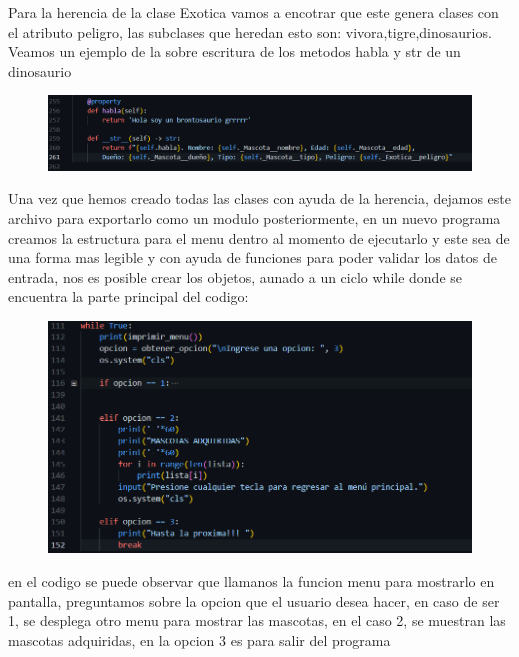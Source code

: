 \documentclass[12pt]{article}
\begin{document}
Para la herencia de la clase Exotica vamos a encotrar que este genera clases con el atributo peligro, las subclases que heredan esto son: vivora,tigre,dinosaurios. Veamos un ejemplo de la sobre escritura de los metodos habla y str de un dinosaurio
\begin{figure}[H]
		\begin{center}
 			\includegraphics[width = .9\textwidth]{13.png}
 			
 			 	
		\end{center} 
\end{figure}
Una vez que hemos creado todas las clases con ayuda de la herencia, dejamos este archivo para exportarlo como un modulo posteriormente, en un nuevo programa creamos la estructura para el menu dentro al momento de ejecutarlo y este sea de una forma mas legible y con ayuda de funciones para poder validar los datos de entrada, nos es posible crear los objetos, aunado a un ciclo while donde se encuentra la parte principal del codigo: 
\begin{figure}[H]
		\begin{center}
 			\includegraphics[width = .9\textwidth]{14.png}
 			
 			 	
		\end{center} 
\end{figure}
en el codigo se puede observar que llamanos la funcion menu para mostrarlo en pantalla, preguntamos sobre la opcion que el usuario desea hacer, en caso de ser 1, se desplega otro menu para mostrar las mascotas, en el caso 2, se muestran las mascotas adquiridas, en la opcion 3 es para salir del programa
\end{document}
